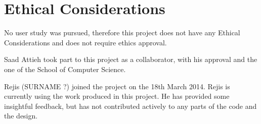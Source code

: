 \chapter{Ethical Considerations}

No user study was pursued, therefore this project does not have any Ethical Considerations and does not require ethics approval.

Saad Attieh took part to this project as a collaborator, with his approval and the one of the School of Computer Science. 

Rejis (SURNAME ?) joined the project on the 18th March 2014. Rejis is currently using the work produced in this project. He has provided some insightful feedback, but has not contributed  actively to any parts of the code and the design. 